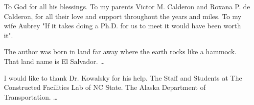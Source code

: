 \maketitlepage

\begin{dedication}
 \centering  To God for all his blessings. To my parents Victor M. Calderon and Roxana P. de Calderon, for all their love and support throughout the years and miles. To my wife Aubrey "If it takes doing a Ph.D. for us to meet it would have been worth it".
\end{dedication}
%
\begin{biography}
The author was born in land far away where the earth rocks like a hammock. That land name is El Salvador. \ldots
\end{biography}
%
\begin{acknowledgements}
I would like to thank Dr. Kowalsky for his help. The Staff and Students at The Constructed Facilities Lab of NC State. The Alaska Department of Transportation. \ldots
\end{acknowledgements}


\thesistableofcontents

\thesislistoftables

\thesislistoffigures
